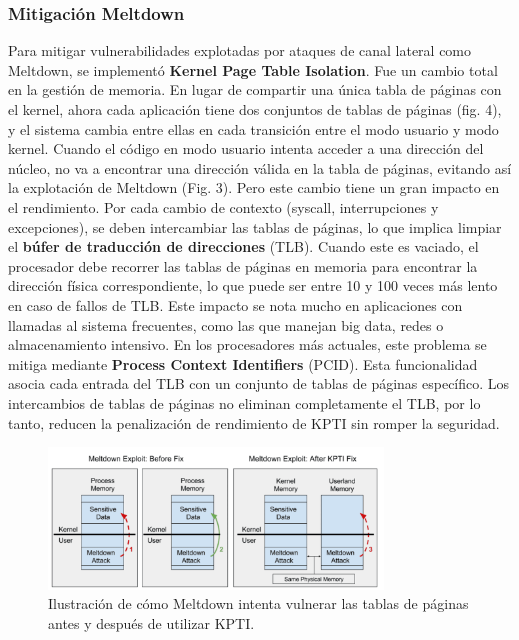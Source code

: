 \documentclass[lettersize,compsoc]{IEEEtran}
\begin{document}
\subsubsection{\textbf{Mitigación Meltdown}} Para mitigar vulnerabilidades explotadas por ataques de canal lateral como Meltdown, se implementó \textbf{Kernel Page Table Isolation}\cite{PTI,Aleatorización}. Fue un cambio total en la gestión de memoria. En lugar de compartir una única tabla de páginas con el kernel, ahora cada aplicación tiene dos conjuntos de tablas de páginas (fig. 4), y el sistema cambia entre ellas en cada transición entre el modo usuario y modo kernel. Cuando el código en modo usuario intenta acceder a una dirección del núcleo, no va a encontrar una dirección válida en la tabla de páginas, evitando así la explotación de Meltdown (Fig. 3). Pero este cambio tiene un gran impacto en el rendimiento. Por cada cambio de contexto (syscall, interrupciones y excepciones), se deben intercambiar las tablas de páginas, lo que implica limpiar el \textbf{búfer de traducción de direcciones} (TLB). Cuando este es vaciado, el procesador debe recorrer las tablas de páginas en memoria para encontrar la dirección física correspondiente, lo que puede ser entre 10 y 100 veces más lento en caso de fallos de TLB. Este impacto se nota mucho en aplicaciones con llamadas al sistema frecuentes, como las que manejan big data, redes o almacenamiento intensivo. En los procesadores más actuales, este problema se mitiga mediante \textbf{Process Context Identifiers}\cite{PCID} (PCID). Esta funcionalidad asocia cada entrada del TLB con un conjunto de tablas de páginas específico. Los intercambios de tablas de páginas no eliminan completamente el TLB, por lo tanto, reducen la penalización de rendimiento de KPTI sin romper la seguridad.

\begin{figure}[h] \centering \includegraphics[width=3.5in]{kpti-meltdown.png} \caption{\small Ilustración de cómo Meltdown intenta vulnerar las tablas de páginas antes y después de utilizar KPTI.} \end{figure}
\end{document}
